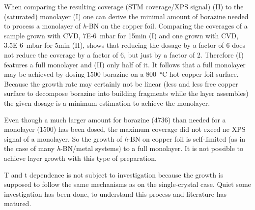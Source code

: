 When comparing the resulting coverage (STM coverage/XPS signal) (II) to the (saturated) monolayer (I) one can derive the minimal amount of borazine needed to process a monolayer of \textit{h}-BN on the copper foil. Comparing the coverages of a sample grown with CVD, \SI{7E-6}{\milli \bar} for 15min (I) and one grown with CVD, \SI{3.5E-6}{\milli \bar} for 5min (II), shows that reducing the dosage by a factor of 6 does not reduce the coverage by a factor of 6, but just by a factor of 2. Therefore (I) features a full monolayer and (II) only half of it. It follows that a full monolayer may be achieved by dosing \SI{1500}{\langmuir} borazine on a \SI{800}{\degreeCelsius} hot copper foil surface. 
Because the growth rate may certainly not be linear (less and less free copper surface to decompose borazine into building fragments while the layer assembles) the given dosage is a minimum estimation to achieve the monolayer.

Even though a much larger amount for borazine (\SI{4736}{\langmuir}) than needed for a monolayer (\SI{1500}{\langmuir}) has been dosed, the maximum coverage did not exeed ne XPS signal of a monolayer. So the growth of \textit{h}-BN on copper foil is self-limited (as in the case of many \textit{h}-BN/metal systems) to a full monolayer. It is not possible to achieve layer growth with this type of preparation.

T and t dependence is not subject to investigation because the growth is supposed to follow the same mechanisms as on the single-crystal case. Quiet some investigation has been done, \cite{orlando_epitaxial_2012,preobrajenski_monolayer_2007-1} to understand this process and literature has matured.